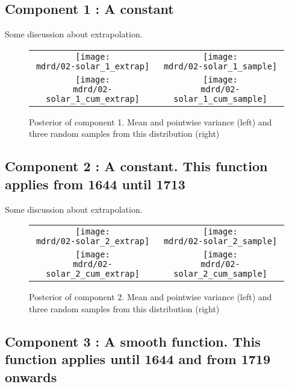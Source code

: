 \documentclass{article} %
\begin{document}
\subsection{Component 1 : A constant}

Some discussion about extrapolation.

\begin{figure}[H]
\newcommand{\wmgd}{0.5\columnwidth}
\newcommand{\hmgd}{3.0cm}
\newcommand{\mdrd}{figures/02-solar}
\newcommand{\mbm}{\hspace{-0.3cm}}
\begin{tabular}{cc}
\mbm \texttt{[image: \\mdrd/02-solar\_1\_extrap]} & \texttt{[image: \\mdrd/02-solar\_1\_sample]} \\
\mbm \texttt{[image: \\mdrd/02-solar\_1\_cum\_extrap]} & \texttt{[image: \\mdrd/02-solar\_1\_cum\_sample]}
\end{tabular}
\caption{Posterior of component 1. Mean and pointwise variance (left) and three random samples from this distribution (right)}
\label{fig:extrap1}
\end{figure}

\subsection{Component 2 : A constant. This function applies from 1644 until 1713}

Some discussion about extrapolation.

\begin{figure}[H]
\newcommand{\wmgd}{0.5\columnwidth}
\newcommand{\hmgd}{3.0cm}
\newcommand{\mdrd}{figures/02-solar}
\newcommand{\mbm}{\hspace{-0.3cm}}
\begin{tabular}{cc}
\mbm \texttt{[image: \\mdrd/02-solar\_2\_extrap]} & \texttt{[image: \\mdrd/02-solar\_2\_sample]} \\
\mbm \texttt{[image: \\mdrd/02-solar\_2\_cum\_extrap]} & \texttt{[image: \\mdrd/02-solar\_2\_cum\_sample]}
\end{tabular}
\caption{Posterior of component 2. Mean and pointwise variance (left) and three random samples from this distribution (right)}
\label{fig:extrap2}
\end{figure}

\subsection{Component 3 : A smooth function. This function applies until 1644 and from 1719 onwards}
\end{document}
